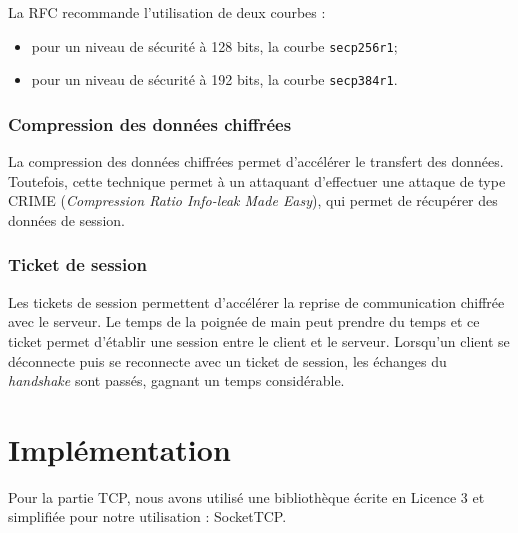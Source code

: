 La RFC recommande l'utilisation de deux courbes :
\begin{itemize}
\item pour un niveau de sécurité à 128 bits, la courbe \texttt{secp256r1};
\item pour un niveau de sécurité à 192 bits, la courbe \texttt{secp384r1}.
\end{itemize}



\subsubsection{Compression des données chiffrées}
La compression des données chiffrées permet d'accélérer le transfert des données. Toutefois, cette technique permet à un attaquant d'effectuer une attaque de type CRIME (\textit{Compression Ratio Info-leak Made Easy}), qui permet de récupérer des données de session. %


\subsubsection{Ticket de session}
Les tickets de session permettent d'accélérer la reprise de communication chiffrée avec le serveur. Le temps de la poignée de main peut prendre du temps et ce ticket permet d'établir une session entre le client et le serveur. Lorsqu'un client se déconnecte puis se reconnecte avec un ticket de session, les échanges du \textit{handshake} sont passés, gagnant un temps considérable. 



\section{Implémentation}
Pour la partie TCP, nous avons utilisé une bibliothèque écrite en Licence 3 et simplifiée pour notre utilisation : SocketTCP.

